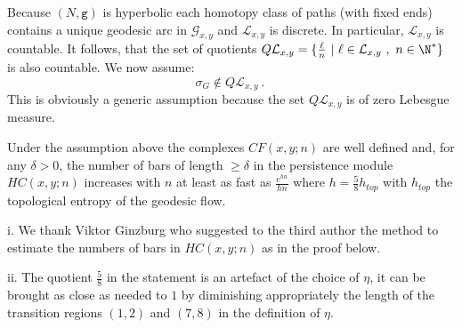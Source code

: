 Because $(N, \mathtt{g})$ is hyperbolic each homotopy class of paths (with fixed ends) contains a unique geodesic arc in $\mathcal{G}_{x,y}$  and $\mathcal{L}_{x,y}$ is discrete. In particular, $\mathcal{L}_{x,y}$ is countable. It follows, that
the set of quotients $Q\mathcal{L}_{x,y}=\{ \frac{\ell}{n}\ | \  \ell \in \mathcal{L}_{x,y}\ , \  n\in \N^{\ast}\}$ is also countable. We now assume:
\begin{equation}\label{eq:assumption_1}
\sigma_{G}\not \in  Q\mathcal{L}_{x,y}~.~
\end{equation}
This is obviously a generic assumption because the set $Q\mathcal{L}_{x,y}$ is of
zero Lebesgue measure.
\begin{lem}\label{lem:fibers} Under the assumption above the complexes $CF(x,y;n)$ are well defined and, for any $\delta>0$, the number of bars of length $\geq \delta$ in the persistence module $HC(x,y;n)$ increases with $n$ at least as fast as  $\frac{e^{hn}}{hn}$  where $h=\frac{5}{8}h_{top}$ with $h_{top}$ the topological entropy of the geodesic flow.
\end{lem}
\begin{rem}\label{rem:thanks_VG} i. We thank Viktor Ginzburg who suggested to the third author the method to estimate the numbers of bars in $HC(x,y;n)$ as in the proof below.

ii. The quotient $\frac{5}{8}$ in the statement is an artefact of the choice of $\eta$,
it can be brought as close as needed to $1$ by diminishing appropriately the length of the transition regions $(1,2)$ and $(7,8)$ in the definition of $\eta$.
\end{rem}



